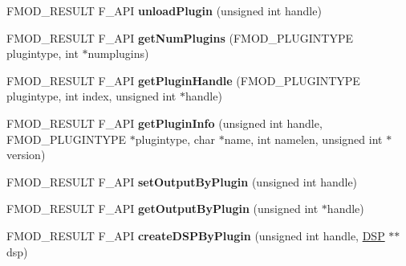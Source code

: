 \begin{DoxyCompactItemize}
\item 
\hypertarget{class_f_m_o_d_1_1_system_a07ae0f13eb4b291651f34c8fa59d76ff}{F\-M\-O\-D\-\_\-\-R\-E\-S\-U\-L\-T F\-\_\-\-A\-P\-I {\bfseries unload\-Plugin} (unsigned int handle)}\label{class_f_m_o_d_1_1_system_a07ae0f13eb4b291651f34c8fa59d76ff}

\item 
\hypertarget{class_f_m_o_d_1_1_system_a1a066a03febf0c76a43162e5abc09c7b}{F\-M\-O\-D\-\_\-\-R\-E\-S\-U\-L\-T F\-\_\-\-A\-P\-I {\bfseries get\-Num\-Plugins} (F\-M\-O\-D\-\_\-\-P\-L\-U\-G\-I\-N\-T\-Y\-P\-E plugintype, int $\ast$numplugins)}\label{class_f_m_o_d_1_1_system_a1a066a03febf0c76a43162e5abc09c7b}

\item 
\hypertarget{class_f_m_o_d_1_1_system_aa94d36d0d28721e35ec47fb1ef06ce1f}{F\-M\-O\-D\-\_\-\-R\-E\-S\-U\-L\-T F\-\_\-\-A\-P\-I {\bfseries get\-Plugin\-Handle} (F\-M\-O\-D\-\_\-\-P\-L\-U\-G\-I\-N\-T\-Y\-P\-E plugintype, int index, unsigned int $\ast$handle)}\label{class_f_m_o_d_1_1_system_aa94d36d0d28721e35ec47fb1ef06ce1f}

\item 
\hypertarget{class_f_m_o_d_1_1_system_a68da30ad69d2f9320ddbdc4ced35fec1}{F\-M\-O\-D\-\_\-\-R\-E\-S\-U\-L\-T F\-\_\-\-A\-P\-I {\bfseries get\-Plugin\-Info} (unsigned int handle, F\-M\-O\-D\-\_\-\-P\-L\-U\-G\-I\-N\-T\-Y\-P\-E $\ast$plugintype, char $\ast$name, int namelen, unsigned int $\ast$version)}\label{class_f_m_o_d_1_1_system_a68da30ad69d2f9320ddbdc4ced35fec1}

\item 
\hypertarget{class_f_m_o_d_1_1_system_a014b2d9623aca816e8054867517067ff}{F\-M\-O\-D\-\_\-\-R\-E\-S\-U\-L\-T F\-\_\-\-A\-P\-I {\bfseries set\-Output\-By\-Plugin} (unsigned int handle)}\label{class_f_m_o_d_1_1_system_a014b2d9623aca816e8054867517067ff}

\item 
\hypertarget{class_f_m_o_d_1_1_system_a4fc02b0d0253fb9c16427393d25bad59}{F\-M\-O\-D\-\_\-\-R\-E\-S\-U\-L\-T F\-\_\-\-A\-P\-I {\bfseries get\-Output\-By\-Plugin} (unsigned int $\ast$handle)}\label{class_f_m_o_d_1_1_system_a4fc02b0d0253fb9c16427393d25bad59}

\item 
\hypertarget{class_f_m_o_d_1_1_system_a3b6b43cfc7eced0c0babf56403d91f6f}{F\-M\-O\-D\-\_\-\-R\-E\-S\-U\-L\-T F\-\_\-\-A\-P\-I {\bfseries create\-D\-S\-P\-By\-Plugin} (unsigned int handle, \hyperlink{class_f_m_o_d_1_1_d_s_p}{D\-S\-P} $\ast$$\ast$dsp)}\label{class_f_m_o_d_1_1_system_a3b6b43cfc7eced0c0babf56403d91f6f}


\end{DoxyCompactItemize}
